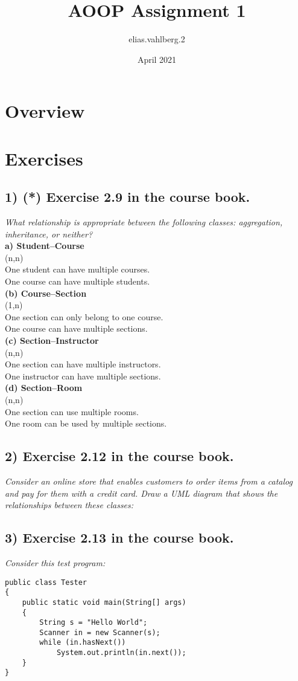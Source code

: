 \documentclass{article}
\title{AOOP Assignment 1 }
\author{elias.vahlberg.2 }
\date{April 2021}
\begin{document}
\maketitle

\section*{Overview}
\section*{Exercises}
\subsection*{1) (*) Exercise 2.9 in the course book.}
\textit{What relationship is appropriate between the following classes: aggregation,
inheritance, or neither?}\\
\textbf{a) Student–Course}\\
\indent (n,n) \\
\indent    One student can have multiple courses.\\
\indent    One course can have multiple students.\\
\textbf{(b) Course–Section}\\
\indent    (1,n)\\
\indent    One section can only belong to one course.\\
\indent    One course can have multiple sections.\\
\textbf{(c) Section–Instructor}\\
\indent    (n,n)\\
\indent    One section can have multiple instructors.\\
\indent    One instructor can have multiple sections.\\
\textbf{(d) Section–Room}\\
\indent    (n,n)\\
\indent    One section can use multiple rooms.\\
\indent    One room can be used by multiple sections.\\
\subsection*{2) Exercise 2.12 in the course book.}
\textit{Consider an online store that enables customers to order items from a catalog and
pay for them with a credit card. Draw a UML diagram that shows the relationships
between these classes:}\\
\subsection*{3) Exercise 2.13 in the course book.}
\textit{Consider this test program:}
\begin{verbatim}
public class Tester
{
    public static void main(String[] args)
    {
        String s = "Hello World";
        Scanner in = new Scanner(s);
        while (in.hasNext())
            System.out.println(in.next());
    }
}
\end{verbatim}

\end{document}
